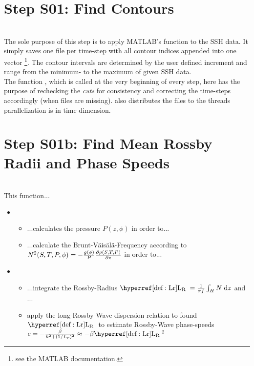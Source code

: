  \section{Step S01: Find Contours}
\\
The sole purpose of this step is to apply MATLAB's  function
to the SSH data. It simply saves one file per time-step with all contour indices
appended into one vector \footnote{see the MATLAB documentation.}. The contour
intervals are determined by the user defined increment and range from the
minimum- to the maximum of given SSH data. \\
The function , which is called at the very beginning of
every step, here has the purpose of rechecking the \textit{cuts} for
consistency and correcting the time-steps accordingly (\ie when files are
missing).  also distributes the files to the threads \ie
parallelization is in time dimension.



\section{Step S01b: Find Mean Rossby Radii and Phase Speeds}
\\

This function...
\begin{itemize}
	\item
	\begin{itemize}
		\item
		...calculates the pressure $P(z,\phi)$ in order to...
		\item
		...calculate the Brunt-V\"ais\"al\"a-Frequency according to $N^{2}(S,T,P,\phi)=-\frac{g(\phi)}{P} \frac{\partial \rho(S,T,P)}{\partial z}$
		in order to...	
	\end{itemize}
	\item
	\begin{itemize}
		\item
		...integrate the Rossby-Radius $\Lr=\frac{1}{\pi f}\INT{H}{ }{N}{z}$ and ...
		\item
		apply the long-Rossby-Wave dispersion relation to found $\Lr$ to estimate Rossby-Wave phase-speeds $c=-\frac{\beta}{k^2+(1/L_r)^2} \approx -\beta \Lr^2$
	\end{itemize}
\end{itemize}

